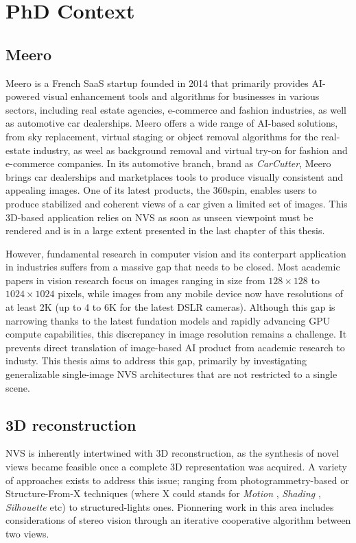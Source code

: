 \section{PhD Context}

\subsection{Meero}
Meero is a French \ac{SaaS} startup founded in 2014 that primarily provides \ac{AI}-powered visual enhancement tools and algorithms for businesses in various sectors, including real estate agencies, e-commerce and fashion industries, as well as automotive car dealerships. Meero offers a wide range of \ac{AI}-based solutions, from sky replacement, virtual staging or object removal algorithms for the real-estate industry, as weel as background removal and virtual try-on for fashion and e-commerce companies. In its automotive branch, brand as \textit{CarCutter}, Meero brings car dealerships and marketplaces tools to produce visually consistent and appealing images. One of its latest products, the 360\degree spin, enables users to produce stabilized and coherent views of a car given a limited set of images. This 3D-based application relies on \ac{NVS} as soon as unseen viewpoint must be rendered and is in a large extent presented in the last chapter of this thesis.

However, fundamental research in computer vision and its conterpart application in industries suffers from a massive gap that needs to be closed. Most academic papers in vision research focus on images ranging in size from $128\times128$ to $1024\times1024$ pixels, while images from any mobile device now have resolutions of at least 2K (up to 4 to 6K for the latest \ac{DSLR} cameras). Although this gap is narrowing thanks to the latest fundation models and rapidly advancing \ac{GPU} compute capabilities, this discrepancy in image resolution remains a challenge. It prevents direct translation of image-based \ac{AI} product from academic research to industy. This thesis aims to address this gap, primarily by investigating generalizable single-image \ac{NVS} architectures that are not restricted to a single scene. 

\subsection{3D reconstruction}
 \ac{NVS} is inherently intertwined with 3D reconstruction, as the synthesis of novel views became feasible once a complete 3D representation was acquired. A variety of approaches exists to address this issue; ranging from photogrammetry-based or Structure-From-X techniques (where X could stands for \textit{Motion} \citep{longuet1981computer}, \textit{Shading} \citep{horn1989obtaining}, \textit{Silhouette}\citep{baumgart1974geometric} etc) to structured-lights ones. Pionnering work in this area includes considerations of stereo vision \citep{marr1976cooperative} through an iterative cooperative algorithm between two views. 
 

